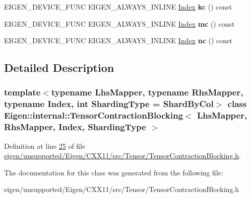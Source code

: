 \begin{DoxyCompactItemize}
\item 
\mbox{\label{class_eigen_1_1internal_1_1_tensor_contraction_blocking_a1d0ebb5af6b5ad9259101307d6d46e86}} 
E\+I\+G\+E\+N\+\_\+\+D\+E\+V\+I\+C\+E\+\_\+\+F\+U\+NC E\+I\+G\+E\+N\+\_\+\+A\+L\+W\+A\+Y\+S\+\_\+\+I\+N\+L\+I\+NE \hyperlink{namespace_eigen_a62e77e0933482dafde8fe197d9a2cfde}{Index} {\bfseries kc} () const
\item 
\mbox{\label{class_eigen_1_1internal_1_1_tensor_contraction_blocking_a063082b20658326d64fe36e83bfa5be4}} 
E\+I\+G\+E\+N\+\_\+\+D\+E\+V\+I\+C\+E\+\_\+\+F\+U\+NC E\+I\+G\+E\+N\+\_\+\+A\+L\+W\+A\+Y\+S\+\_\+\+I\+N\+L\+I\+NE \hyperlink{namespace_eigen_a62e77e0933482dafde8fe197d9a2cfde}{Index} {\bfseries mc} () const
\item 
\mbox{\label{class_eigen_1_1internal_1_1_tensor_contraction_blocking_ab22f2498409ad872a66d320ae2607571}} 
E\+I\+G\+E\+N\+\_\+\+D\+E\+V\+I\+C\+E\+\_\+\+F\+U\+NC E\+I\+G\+E\+N\+\_\+\+A\+L\+W\+A\+Y\+S\+\_\+\+I\+N\+L\+I\+NE \hyperlink{namespace_eigen_a62e77e0933482dafde8fe197d9a2cfde}{Index} {\bfseries nc} () const
\end{DoxyCompactItemize}


\subsection{Detailed Description}
\subsubsection*{template$<$typename Lhs\+Mapper, typename Rhs\+Mapper, typename Index, int Sharding\+Type = Shard\+By\+Col$>$\newline
class Eigen\+::internal\+::\+Tensor\+Contraction\+Blocking$<$ Lhs\+Mapper, Rhs\+Mapper, Index, Sharding\+Type $>$}



Definition at line \hyperlink{eigen_2unsupported_2_eigen_2_c_x_x11_2src_2_tensor_2_tensor_contraction_blocking_8h_source_l00025}{25} of file \hyperlink{eigen_2unsupported_2_eigen_2_c_x_x11_2src_2_tensor_2_tensor_contraction_blocking_8h_source}{eigen/unsupported/\+Eigen/\+C\+X\+X11/src/\+Tensor/\+Tensor\+Contraction\+Blocking.\+h}.



The documentation for this class was generated from the following file\+:\begin{DoxyCompactItemize}
\item 
eigen/unsupported/\+Eigen/\+C\+X\+X11/src/\+Tensor/\+Tensor\+Contraction\+Blocking.\+h\end{DoxyCompactItemize}
